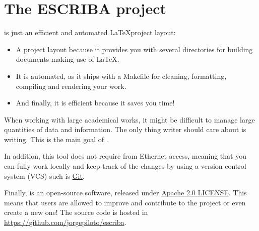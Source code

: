 \chapter{The ESCRIBA project}

\ESCRIBA is just an efficient and automated \LaTeX project layout:

\begin{itemize}
  \item A project layout because it provides you with several directories
        for building documents making use of \LaTeX.
  \item It is automated, as it ships with a Makefile for cleaning, formatting,
        compiling and rendering your work.
  \item And finally, it is efficient because it saves you time!
\end{itemize}

When working with large academical works, it might be difficult to manage large
quantities of data and information. The only thing writer should care about is
writing. This is the main goal of \ESCRIBA.

In addition, this tool does not require from Ethernet access, meaning that you
can fully work locally and keep track of the changes by using a version control
system (VCS) such is \href{https://git-scm.com/}{Git}.

Finally, \ESCRIBA is an open-source software, released under
\href{https://github.com/jorgepiloto/escriba/blob/main/LICENSE}{Apache 2.0
  LICENSE}. This means that users are allowed to improve and contribute to the
project or even create a new one! The source code is hosted in
\href{https://github.com/jorgepiloto/escriba}{https://github.com/jorgepiloto/escriba}.
